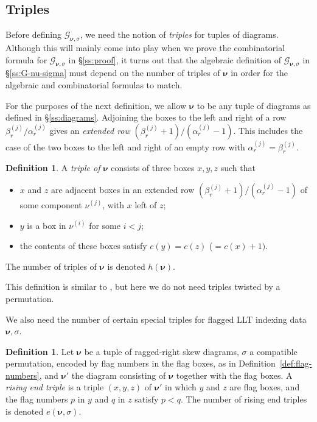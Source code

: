 \documentclass[12pt]{amsart}
\theoremstyle{definition}
\newtheorem{defn}[thm]{Definition}
\theoremstyle{remark}
\newcommand{\nubold}{{\boldsymbol \nu }}
\newcommand{\Gcal}{{\mathcal G}}
\begin{document}
\subsection{Triples}
\label{ss:triples}

Before defining $\Gcal _{\nubold ,\sigma }$, we need the notion of
{\em triples} for tuples of diagrams.  Although this will mainly come
into play when we prove the combinatorial formula for $\Gcal _{\nubold
,\sigma }$ in \S \ref{ss:proof}, it turns out that the algebraic
definition of $\Gcal _{\nubold ,\sigma }$ in \S \ref{ss:G-nu-sigma}
must depend on the number of triples of $\nubold $ in order for the
algebraic and combinatorial formulas to match.

For the purposes of the next definition, we allow $\nubold $ to be any
tuple of diagrams as defined in \S\ref{ss:diagrams}.  Adjoining the
boxes to the left and right of a row $\beta ^{(j)}_{r}/\alpha
^{(j)}_{r}$ gives an {\em extended row} $(\beta ^{(j)}_{r}+1)/(\alpha
^{(j)}_{r} - 1)$.  This includes the case of the two boxes to the left
and right of an empty row with $\alpha ^{(j)}_{r} =\beta ^{(j)}_{r}$.

\begin{defn}\label{def:triple}
A {\em triple of $\nubold $} consists of three boxes $x,y,z$ such that
\begin{itemize}
\item [(i)] $x$ and $z$ are adjacent boxes in an extended row $(\beta
^{(j)}_{r}+1)/(\alpha ^{(j)}_{r} - 1)$ of some component $\nu ^{(j)}$,
with $x$ left of $z$;
\item [(ii)] $y$ is a box in $\nu ^{(i)}$ for some $i<j$;
\item [(iii)] the contents of these boxes satisfy $c(y) = c(z)$
($=c(x)+1)$.
\end{itemize}
The number of triples of $\nubold $ is denoted $h(\nubold )$.
\end{defn}

This definition is similar to \cite[Definition 5.5.1]{BHMPS25a}, but
here we do not need triples twisted by a permutation.

We also need the number of certain special triples for flagged LLT
indexing data $\nubold ,\sigma $.

\begin{defn}\label{def:end-triples}
Let $\nubold $ be a tuple of ragged-right skew diagrams, $\sigma $ a
compatible permutation, encoded by flag numbers in the flag boxes, as
in Definition~\ref{def:flag-numbers}, and $\nubold '$ the diagram
consisting of $\nubold $ together with the flag boxes.  A {\em rising
end triple} is a triple $(x,y,z)$ of $\nubold '$ in which $y$ and $z$
are flag boxes, and the flag numbers $p$ in $y$ and $q$ in $z$ satisfy
$p<q$.  The number of rising end triples is denoted $e(\nubold ,\sigma
)$.
\end{defn}
\end{document}
